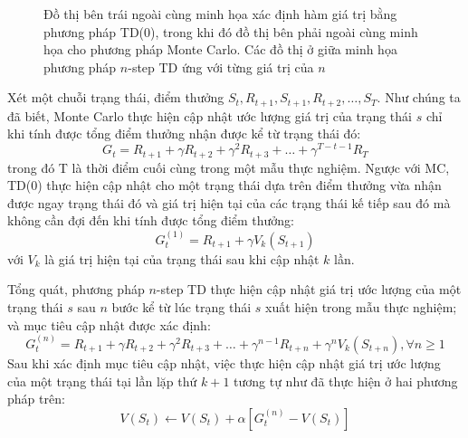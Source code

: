 \begin{figure}
	\caption[Minh họa phương pháp $n$-step TD]{Đồ thị bên trái ngoài cùng minh họa xác định hàm giá trị bằng phương pháp TD(0), trong khi đó đồ thị bên phải ngoài cùng minh họa cho phương pháp Monte Carlo. Các đồ thị ở giữa minh họa phương pháp $n$-step TD ứng với từng giá trị của $n$}
	\label{fig:n_TD}
\end{figure}

Xét một chuỗi trạng thái, điểm thưởng $\mathit{S}_{t}, \mathit{R}_{t+1}, \mathit{S}_{t+1}, \mathit{R}_{t+2}, \dots, \mathit{S}_{T}$. Như chúng ta đã biết, Monte Carlo thực hiện cập nhật ước lượng giá trị của trạng thái $s$ chỉ khi tính được tổng điểm thưởng nhận được kể từ trạng thái đó:
\begin{equation*}
G_{t} = \mathit{R}_{t+1} + \gamma \mathit{R}_{t+2} + \gamma^{2} \mathit{R}_{t+3} + \dots + \gamma^{T-t-1}\mathit{R}_T
\end{equation*}
trong đó T là thời điểm cuối cùng trong một mẫu thực nghiệm. Ngược với MC, TD(0) thực hiện cập nhật cho một trạng thái dựa trên điểm thưởng vừa nhận được ngay trạng thái đó và giá trị hiện tại của các trạng thái kế tiếp sau đó mà không cần đợi đến khi tính được tổng điểm thưởng:
\begin{equation*}
G_{t}^{(1)} = \mathit{R}_{t+1} + \gamma V_{k}(\mathit{S}_{t+1}) 
\end{equation*}
với $V_k$ là giá trị hiện tại của trạng thái sau khi cập nhật $k$ lần.

Tổng quát, phương pháp $n$-step TD thực hiện cập nhật giá trị ước lượng của một trạng thái $s$ sau $n$ bước kể từ lúc trạng thái $s$ xuất hiện trong mẫu thực nghiệm; và mục tiêu cập nhật được xác định:
\begin{equation}
G_{t}^{(n)} = \mathit{R}_{t+1} + \gamma \mathit{R}_{t+2} + \gamma^2 \mathit{R}_{t+3} + \dots + \gamma^{n-1}\mathit{R}_{t+n} + \gamma^{n}V_{k}(\mathit{S}_{t+n}), \forall n \geq 1
\label{eq:n_TD_goal}
\end{equation}
Sau khi xác định mục tiêu cập nhật, việc thực hiện cập nhật giá trị ước lượng của một trạng thái tại lần lặp thứ $k + 1$ tương tự như đã thực hiện ở hai phương pháp trên:
\begin{equation*}
V(\mathit{S}_t) \leftarrow V(\mathit{S}_t) + \alpha \left[ G_{t}^{(n)} - V(\mathit{S}_t) \right]
\end{equation*}

